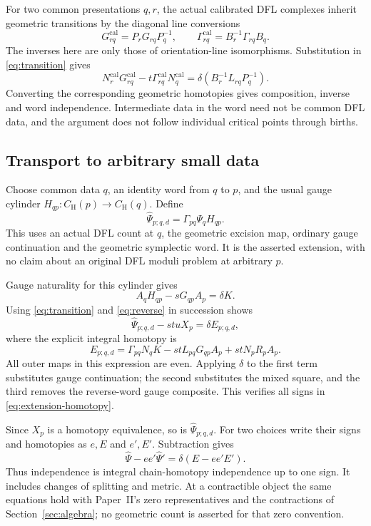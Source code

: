 \documentclass[11pt]{amsart}
\theoremstyle{definition}
\theoremstyle{remark}
\theoremstyle{plain}
\newcommand{\calib}{\mathrm{cal}}
\newcommand{\CH}{C_{\mathrm H}}
\begin{document}
For two common presentations $q,r$, the actual calibrated DFL
complexes inherit geometric transitions by the diagonal line
conversions
\[
 G^{\calib}_{rq}=P_rG_{rq}P_q^{-1},\qquad
 \Gamma^{\calib}_{rq}=B_r^{-1}\Gamma_{rq}B_q.
\]
The inverses here are only those of orientation-line
isomorphisms. Substitution in \eqref{eq:transition} gives
\begin{equation}\label{eq:cal-transition}
 N_r^{\calib}G^{\calib}_{rq}
 -t\Gamma^{\calib}_{rq}N_q^{\calib}
 =\delta(B_r^{-1}L_{rq}P_q^{-1}).
\end{equation}
Converting the corresponding geometric homotopies gives
composition, inverse and word independence. Intermediate data
in the word need not be common DFL data, and the argument does
not follow individual critical points through births.

\subsection{Transport to arbitrary small data}
Choose common data $q$, an identity word from $q$ to $p$, and
the usual gauge cylinder $H_{qp}:\CH(p)\to\CH(q)$. Define
\begin{equation}\label{eq:transported}
 \widehat\Psi_{p;q,d}=\Gamma_{pq}\Psi_qH_{qp}.
\end{equation}
This uses an actual DFL count at $q$, the geometric excision
map, ordinary gauge continuation and the geometric symplectic
word. It is the asserted extension, with no claim about an
original DFL moduli problem at arbitrary $p$.

Gauge naturality for this cylinder gives
\[
 A_qH_{qp}-sG_{qp}A_p=\delta K.
\]
Using \eqref{eq:transition} and \eqref{eq:reverse} in succession
shows
\begin{equation}\label{eq:extension-homotopy}
 \widehat\Psi_{p;q,d}-stuX_p=\delta E_{p;q,d},
\end{equation}
where the explicit integral homotopy is
\begin{equation}\label{eq:E}
 E_{p;q,d}=\Gamma_{pq}N_qK
          -stL_{pq}G_{qp}A_p+stN_pR_pA_p.
\end{equation}
All outer maps in this expression are even. Applying $\delta$
to the first term substitutes gauge continuation; the second
substitutes the mixed square, and the third removes the
reverse-word gauge composite. This verifies all signs in
\eqref{eq:extension-homotopy}.

Since $X_p$ is a homotopy equivalence, so is
$\widehat\Psi_{p;q,d}$. For two choices write their signs and
homotopies as $e,E$ and $e',E'$. Subtraction gives
\[
 \widehat\Psi-ee'\widehat\Psi'
       =\delta(E-ee'E').
\]
Thus independence is integral chain-homotopy independence up to
one sign. It includes changes of splitting and metric. At a
contractible object the same equations hold with Paper~II's
zero representatives and the contractions of
Section~\ref{sec:algebra}; no geometric count is asserted for
that zero convention.
\end{document}

